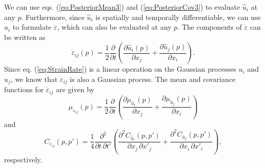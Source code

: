 \documentclass[extra,mreferee]{gji}
\begin{document}
We can use eqs. (\ref{eq:PosteriorMean3}) and (\ref{eq:PosteriorCov3}) to evaluate $\hat{u}_i$ at any $p$. Furthermore, since $\hat{u}_i$ is spatially and temporally differentiable, we can use $\hat{u}_i$ to formulate $\dot\varepsilon$, which can also be evaluated at any $p$. The components of $\dot\varepsilon$ can be written as 
\begin{equation}\label{eq:StrainRate}
\dot\varepsilon_{ij}(p) = \frac{1}{2} \frac{\partial}{\partial t} \left(
                                        \frac{\partial \hat{u}_i(p)}{\partial x_j} +  
                                        \frac{\partial \hat{u}_j(p)}{\partial x_i}\right).
\end{equation}
Since eq. (\ref{eq:StrainRate}) is a linear operation on the Gaussian processes $u_i$ and $u_j$, we know that $\dot\varepsilon_{ij}$ is also a Gaussian process. The mean and covariance functions for $\dot{\varepsilon}_{ij}$ are given by
\begin{equation}\label{eq:StrainMean}
\mu_{\dot\varepsilon_{ij}}(p) = \frac{1}{2}\frac{\partial}{\partial t}\left(
                                  \frac{\partial \mu_{\hat{u}_i}(p)}{\partial x_j} + 
                                  \frac{\partial \mu_{\hat{u}_j}(p)}{\partial x_i} \right)
\end{equation} 
and
\begin{equation}\label{eq:StrainCov}
C_{\dot\varepsilon_{ij}}(p,p') = \frac{1}{4} \frac{\partial^2}{\partial t \, \partial t'}\left(
                                   \frac{\partial^2 C_{\hat{u}_i}(p,p')}{\partial x_j \, \partial x'_j} + 
                                   \frac{\partial^2 C_{\hat{u}_j}(p,p')}{\partial x_i \, \partial x'_i} \right),
\end{equation} 
respectively.
\end{document}

